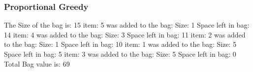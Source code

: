 \documentclass[12]{beamer}
\begin{document}
\begin{frame}
\frametitle{Proportional Greedy}

\begin{flushleft}
\small
\small
\large 
The Size of the bag is:  15 
\newline 
\newline 
\newline 
\small 
item: 5 was added to the bag: Size: 1  Space left in bag: 14 
\newline
item: 4 was added to the bag: Size: 3  Space left in bag: 11 
\newline
item: 2 was added to the bag: Size: 1  Space left in bag: 10 
\newline
item: 1 was added to the bag: Size: 5  Space left in bag: 5 
\newline
item: 3 was added to the bag: Size: 5  Space left in bag: 0 
\newline
\newline 
\large 
Total Bag value is:  69 
\end{flushleft}

\end{frame}
\end{document}
